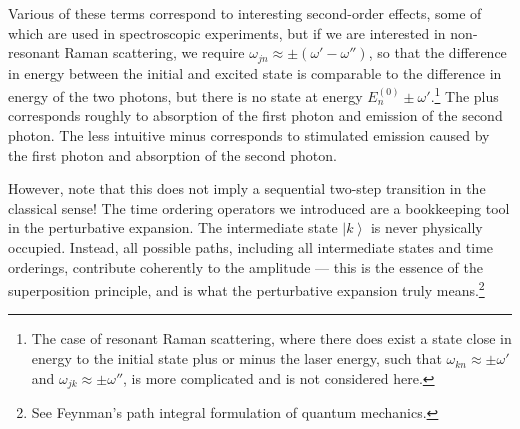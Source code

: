 \documentclass{article}
\theoremstyle{plain}\theoremheaderfont{\normalfont\itshape}\theorembodyfont{\rmfamily}\theoremseparator{.}\newtheorem*{rem}{Remark}\newtheorem*{ex}{Example}\newtheorem*{proof}{Proof}\newtheorem*{altp}{Alternative proof}
\theoremstyle{plain}\theoremheaderfont{\normalfont\bfseries}\theorembodyfont{\rmfamily}\theoremseparator{.}\newtheorem{thm}{Theorem}[section]\newtheorem{lem}[thm]{Lemma}\newtheorem{prop}[thm]{Proposition}\newtheorem*{cor}{Corollary}\newtheorem{defn}[thm]{Definition}\newtheorem{clm}[thm]{Claim}\newtheorem{clminproof}{Claim}
\theoremstyle{break}\theoremheaderfont{\normalfont\itshape}\theorembodyfont{\rmfamily}\theoremseparator{.\medskip}\newtheorem*{proofskip}{Proof}\newtheorem*{exs}{Examples}\newtheorem*{rems}{Remarks}
\theoremstyle{break}\theoremheaderfont{\normalfont\bfseries}\theorembodyfont{\rmfamily}\theoremseparator{.\medskip}\newtheorem{lemskip}[thm]{Lemma}\newtheorem{defnskip}[thm]{Definition}\newtheorem{propskip}[thm]{Proposition}\newtheorem{thmskip}[thm]{Theorem}
\numberwithin{equation}{section}
\newcommand{\ket}[1]{\left| #1 \right\rangle}
\begin{document}
    Various of these terms correspond to interesting second-order effects, some of which are used in spectroscopic experiments, but if we are interested in non-resonant Raman scattering, we require \(\omega_{jn}\approx \pm(\omega'-\omega'')\), so that the difference in energy between the initial and excited state is comparable to the difference in energy of the two photons, but there is no state at energy \(E_n^{(0)}\pm\omega'\).\footnote{The case of resonant Raman scattering, where there does exist a state close in energy to the initial state plus or minus the laser energy, such that \(\omega_{kn}\approx\pm\omega'\) and \(\omega_{jk}\approx\pm\omega''\), is more complicated and is not considered here.} The plus corresponds roughly to absorption of the first photon and emission of the second photon. The less intuitive minus corresponds to stimulated emission caused by the first photon and absorption of the second photon.
    
    However, note that this does not imply a sequential two-step transition in the classical sense! The time ordering operators we introduced are a bookkeeping tool in the perturbative expansion. The intermediate state \(\ket{k}\) is never physically occupied. Instead, all possible paths, including all intermediate states and time orderings, contribute coherently to the amplitude --- this is the essence of the superposition principle, and is what the perturbative expansion truly means.\footnote{See Feynman's path integral formulation of quantum mechanics.}
\end{document}

